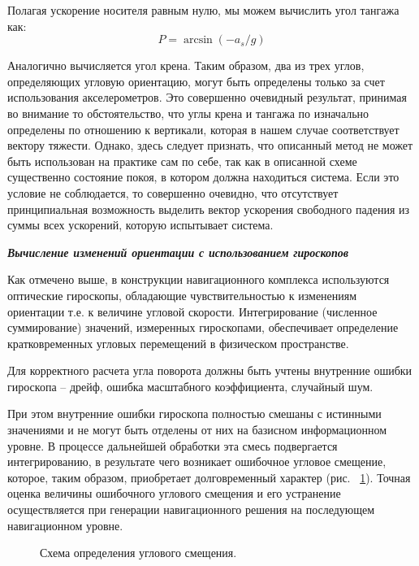Полагая ускорение носителя равным нулю, мы можем вычислить угол тангажа как:
$$P = \arcsin (-a_s/g)$$

Аналогично вычисляется угол крена. Таким образом, два из трех углов, определяющих угловую ориентацию, могут быть определены только за счет использования акселерометров. Это совершенно очевидный результат, принимая во внимание то обстоятельство, что углы крена и тангажа по изначально определены по отношению к вертикали, которая в нашем случае соответствует вектору тяжести. Однако, здесь следует признать, что описанный метод не может быть использован на практике сам по себе, так как в описанной схеме существенно состояние покоя, в котором должна находиться система. Если это условие не соблюдается, то совершенно очевидно, что отсутствует принципиальная возможность выделить вектор ускорения свободного падения из суммы всех ускорений, которую испытывает система.

\textit{\textbf{Вычисление изменений ориентации с использованием гироскопов}}

Как отмечено выше, в конструкции навигационного комплекса используются оптические гироскопы, обладающие чувствительностью к изменениям ориентации т.е. к величине угловой скорости. Интегрирование (численное суммирование) значений, измеренных гироскопами, обеспечивает определение кратковременных угловых перемещений в физическом пространстве.

Для корректного расчета угла поворота должны быть учтены
внутренние ошибки гироскопа – дрейф, ошибка масштабного коэффициента, случайный шум.

При этом внутренние ошибки  гироскопа полностью смешаны с истинными значениями и не могут быть отделены от них на базисном информационном уровне. В процессе дальнейшей обработки эта смесь подвергается интегрированию, в результате чего возникает ошибочное угловое смещение, которое, таким образом, приобретает долговременный характер (рис. ~\ref{pic:acell}). Точная оценка величины ошибочного углового смещения и его устранение осуществляется при генерации навигационного решения на последующем навигационном уровне.

\begin{figure}[!htb]
\caption{Схема определения углового смещения.}
\label{pic:acell}
\end{figure}

